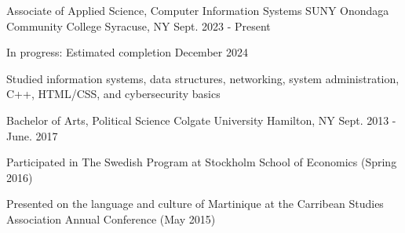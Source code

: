 


\begin{cventries}



\cventry
{Associate of Applied Science, Computer Information Systems} %
{SUNY Onondaga Community College} %
{Syracuse, NY} %
{Sept. 2023 - Present} %
{ %
\begin{cvitems}
\item {In progress: Estimated completion December 2024}
\item {Studied information systems, data structures, networking, system administration, C++, HTML/CSS, and cybersecurity basics}
\end{cvitems}
}


\end{cventries}

\begin{cventries}


\cventry
{Bachelor of Arts, Political Science} %
{Colgate University} %
{Hamilton, NY} %
{Sept. 2013 - June. 2017} %
{ %
\begin{cvitems}
\item {Participated in The Swedish Program at Stockholm School of Economics (Spring 2016)}
\item {Presented on the language and culture of Martinique at the Carribean Studies Association Annual Conference (May 2015)}
\end{cvitems}
}


\end{cventries}
